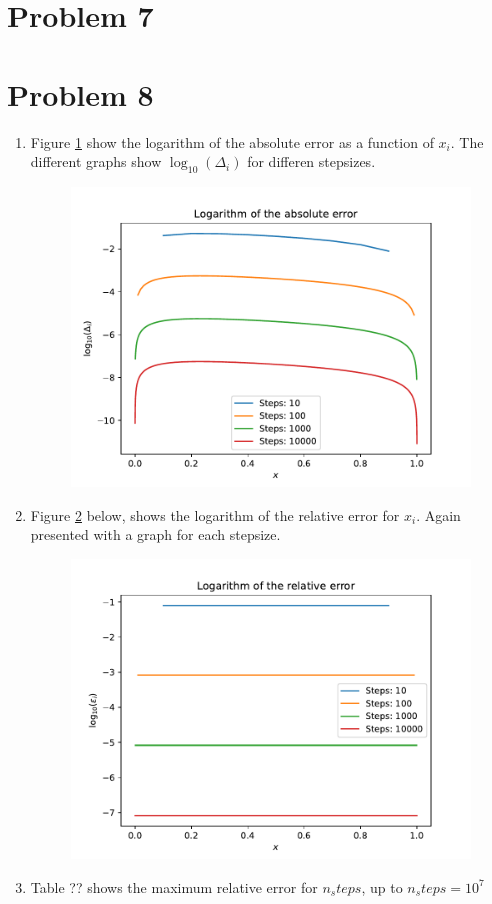 \documentclass[english,notitlepage]{revtex4-1}  %
\begin{document}
\section*{Problem 7}
\section*{Problem 8}
\begin{enumerate}[label= \alph*)]
  \item Figure \ref{fig:abs_error} show the logarithm of the absolute error as a function of $x_i$. The different graphs show $\log_{10}(\Delta_i)$ for differen stepsizes.
  \begin{figure}[H]
      \centering
      \includegraphics[width=\textwidth]{../figures/abs_error.pdf}
      \caption{}
      \label{fig:abs_error}
  \end{figure}
  \item Figure \ref{fig:rel_error} below, shows the logarithm of the relative error for $x_i$. Again presented with a graph for each stepsize.
  \begin{figure}[H]
    \centering
    \includegraphics[width=\textwidth]{../figures/rel_error.pdf}
    \caption{}
    \label{fig:rel_error}
  \end{figure}
  \item Table ?? shows the maximum relative error for $n_steps$, up to $n_steps = 10^7$


\end{enumerate}
\end{document}
